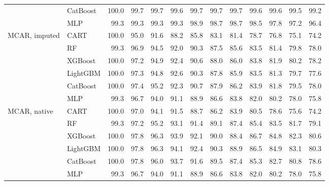 \documentclass[pdflatex,sn-mathphys]{sn-jnl}
\theoremstyle{thmstyleone}
\begin{document}
\begin{table}[htbp]
\begin{tabular}{@{}llrrrrrrrrrrr@{}}
 & CatBoost & 100.0 & 99.7 & 99.7 & 99.6 & 99.7 & 99.7 & 99.7 & 99.6 & 99.6 & 99.5 & 99.2 \\
 & MLP & 99.3 & 99.3 & 99.3 & 99.3 & 98.9 & 98.7 & 98.7 & 98.5 & 97.8 & 97.2 & 96.4 \\
\midrule
MCAR, imputed & CART & 100.0 & 95.0 & 91.6 & 88.2 & 85.8 & 83.1 & 81.4 & 78.7 & 76.8 & 75.1 & 74.2 \\
 & RF & 99.3 & 96.9 & 94.5 & 92.0 & 90.3 & 87.5 & 85.6 & 83.5 & 81.4 & 79.8 & 78.0 \\
 & XGBoost & 100.0 & 97.2 & 94.9 & 92.4 & 90.6 & 88.0 & 86.0 & 83.8 & 81.9 & 80.2 & 78.2 \\
 & LightGBM & 100.0 & 97.3 & 94.8 & 92.6 & 90.3 & 87.8 & 85.9 & 83.5 & 81.3 & 79.7 & 77.6 \\
 & CatBoost & 100.0 & 97.4 & 95.2 & 92.3 & 90.7 & 87.9 & 86.2 & 83.9 & 81.8 & 79.5 & 78.0 \\
 & MLP & 99.3 & 96.7 & 94.0 & 91.1 & 88.9 & 86.6 & 83.8 & 82.0 & 80.2 & 78.0 & 75.8 \\
\midrule
MCAR, native & CART & 100.0 & 97.0 & 94.1 & 91.5 & 88.7 & 86.2 & 83.9 & 80.5 & 78.6 & 75.6 & 74.2 \\
 & RF & 99.3 & 97.2 & 95.2 & 93.1 & 91.4 & 89.1 & 87.4 & 85.4 & 83.5 & 81.7 & 79.1 \\
 & XGBoost & 100.0 & 97.8 & 96.3 & 93.9 & 92.1 & 90.0 & 88.4 & 86.7 & 84.8 & 82.3 & 80.6 \\
 & LightGBM & 100.0 & 97.8 & 96.3 & 94.1 & 92.4 & 90.3 & 88.9 & 86.5 & 84.9 & 83.1 & 80.3 \\
 & CatBoost & 100.0 & 97.8 & 96.0 & 93.7 & 91.6 & 89.5 & 87.4 & 85.3 & 82.7 & 80.8 & 78.6 \\
 & MLP & 99.3 & 96.7 & 94.0 & 91.1 & 88.9 & 86.6 & 83.8 & 82.0 & 80.2 & 78.0 & 75.8 \\
\bottomrule
\end{tabular}
\end{table}
\end{document}
